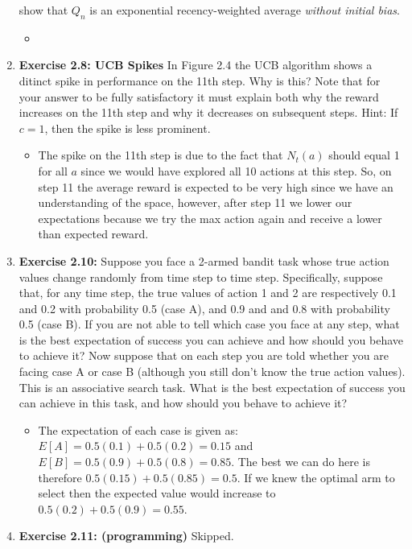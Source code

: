 \documentclass[12pt]{article}
\begin{document}
\begin{enumerate}[label=(\alph*)]
  show that $Q_n$ is an exponential recency-weighted average \textit{without initial bias}.
  \begin{itemize}
    \item 
  \end{itemize}
  \item \textbf{Exercise 2.8: UCB Spikes} In Figure 2.4 the UCB algorithm shows a ditinct spike in performance on the 11th step. Why is this? Note
  that for your answer to be fully satisfactory it must explain both why the reward increases on the 11th step and why it decreases on subsequent
  steps. Hint: If $c = 1$, then the spike is less prominent. 
  \begin{itemize}
    \item The spike on the 11th step is due to the fact that $N_t(a)$ should equal 1 for all $a$ since we would have explored all 10 actions
    at this step. So, on step 11 the average reward is expected to be very high since we have an understanding of the space, however, after 
    step 11 we lower our expectations because we try the max action again and receive a lower than expected reward.
  \end{itemize}
  \item \textbf{Exercise 2.10:} Suppose you face a 2-armed bandit task whose true action values change randomly from time step to time step.
  Specifically, suppose that, for any time step, the true values of action 1 and 2 are respectively 0.1 and 0.2 with probability 0.5
  (case A), and 0.9 and and 0.8 with probability 0.5 (case B). If you are not able to tell which case you face at any step, what is the best
  expectation of success you can achieve and how should you behave to achieve it? Now suppose that on each step you are told whether you are
  facing case A or case B (although you still don't know the true action values). This is an associative search task. What is the best
  expectation of success you can achieve in this task, and how should you behave to achieve it?
  \begin{itemize}
    \item The expectation of each case is given as: $E[A] = 0.5(0.1) + 0.5(0.2) = 0.15$ and $E[B] = 0.5(0.9) + 0.5(0.8) = 0.85$. The best
    we can do here is therefore $0.5(0.15) + 0.5(0.85) = 0.5$. If we knew the optimal arm to select then the expected value would increase to 
    $0.5(0.2) + 0.5(0.9) = 0.55$.
  \end{itemize}
  \item \textbf{Exercise 2.11: (programming)} Skipped.
  

\end{enumerate}
\end{document}
